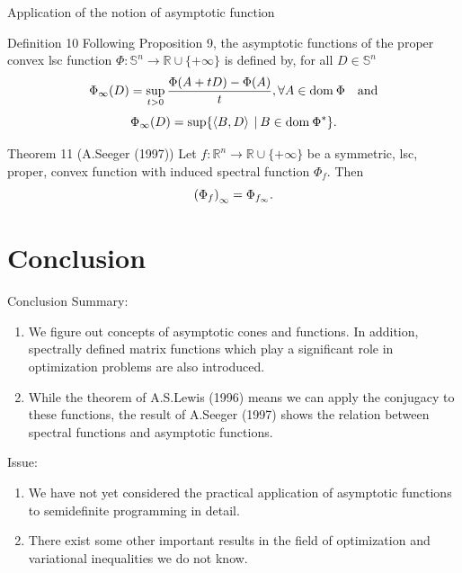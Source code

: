 \documentclass[aspectratio=169, dvipdfmx, 11pt]{beamer}
\newcommand{\RealNumberSet}{\mathbb{R}}
\newcommand{\NDemenstionalRealEuclideanSpace}{\mathbb{R}^n}
\newcommand{\NDemenstionalRealSymmetricMatrixSpace}{\mathbb{S}^n}
\newcommand{\Domain}[1]{\text{\rm dom\:${#1}$}} %
\newcommand{\InnerProduct}[2]{\left\langle {#1},{#2}\right\rangle} %
\newcommand{\ExtendedRealValuedFunction}[2]{{#1}: {#2} \to \RealNumberSet \cup \{+\infty\}}
\newcommand{\ConjugateFunction}[1]{{#1}^*}
\begin{document}
\begin{frame}{Application of the notion of asymptotic function}
  \begin{block}{Definition 10}
    Following Proposition 9, the asymptotic functions of the proper convex lsc function $\ExtendedRealValuedFunction{\Phi}{\NDemenstionalRealSymmetricMatrixSpace}$ is defined by, for all $D \in \NDemenstionalRealSymmetricMatrixSpace$
    \begin{equation}
      \Phi_{\infty} (D) = \sup_{t > 0} \frac{\Phi(A+tD) -\Phi(A)}{t}, \forall A \in \Domain{\Phi} \quad \text{and}\notag
    \end{equation}
    \begin{equation}
      \Phi_{\infty} (D) = \sup \{\InnerProduct{B}{D} \:|\: B \in \Domain{\ConjugateFunction{\Phi}}\}. \notag
    \end{equation}
  \end{block}

  \begin{block}{Theorem 11 (A.Seeger (1997))}
    Let $\ExtendedRealValuedFunction{f}{\NDemenstionalRealEuclideanSpace}$ be a symmetric, lsc, proper, convex function with induced spectral function $\Phi_{f}$. Then
    \begin{equation}
      {(\Phi_{f})}_{\infty} = \Phi_{f_{\infty}}. \notag
    \end{equation}
  \end{block}
\end{frame}

\section{Conclusion}

\begin{frame}{Conclusion}
  Summary:
  \begin{enumerate}[]
    \item We figure out concepts of asymptotic cones and functions. In addition, spectrally defined matrix functions which play a significant role in optimization problems are also introduced.
    \item While the theorem of A.S.Lewis (1996) means we can apply the conjugacy to these functions, the result of A.Seeger (1997) shows the relation between spectral functions and asymptotic functions.
  \end{enumerate}
  Issue:
  \begin{enumerate}[]
    \item We have not yet considered the practical application of asymptotic functions to semidefinite programming in detail.
    \item There exist some other important results in the field of optimization and variational inequalities we do not know.
  \end{enumerate}
\end{frame}
\end{document}
